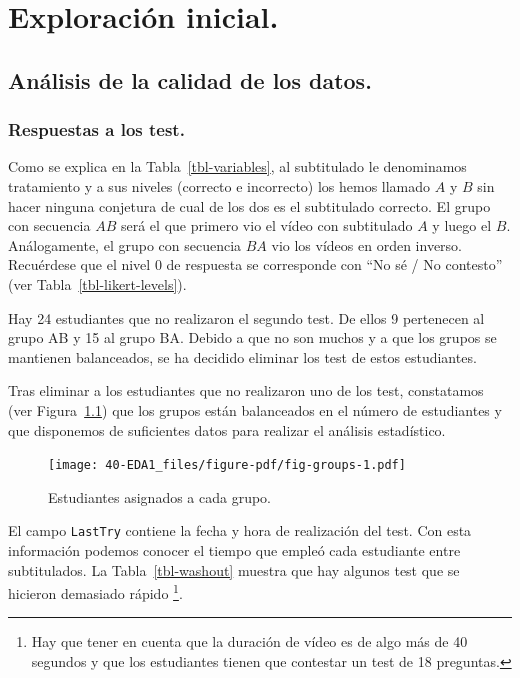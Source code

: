 \documentclass[
  12pt,
  a4paper,
  extrafontsizes,
  onecolumn,
  openright]{memoir}
\begin{document}

\hypertarget{sec-eda}{%
\chapter{Exploración inicial.}\label{sec-eda}}

\hypertarget{anuxe1lisis-de-la-calidad-de-los-datos.}{%
\section{Análisis de la calidad de los
datos.}\label{anuxe1lisis-de-la-calidad-de-los-datos.}}

\hypertarget{sec-eda-2}{%
\subsection{Respuestas a los test.}\label{sec-eda-2}}

Como se explica en la Tabla~\ref{tbl-variables}, al subtitulado le
denominamos tratamiento y a sus niveles (correcto e incorrecto) los
hemos llamado \(A\) y \(B\) sin hacer ninguna conjetura de cual de los
dos es el subtitulado correcto. El grupo con secuencia \(AB\) será el
que primero vio el vídeo con subtitulado \(A\) y luego el \(B\).
Análogamente, el grupo con secuencia \(BA\) vio los vídeos en orden
inverso. Recuérdese que el nivel 0 de respuesta se corresponde con
\enquote{No sé / No contesto} (ver Tabla~\ref{tbl-likert-levels}).

Hay 24 estudiantes que no realizaron el segundo test. De ellos 9
pertenecen al grupo AB y 15 al grupo BA. Debido a que no son muchos y a
que los grupos se mantienen balanceados, se ha decidido eliminar los
test de estos estudiantes.

Tras eliminar a los estudiantes que no realizaron uno de los test,
constatamos (ver Figura~\ref{fig-groups}) que los grupos están
balanceados en el número de estudiantes y que disponemos de suficientes
datos para realizar el análisis estadístico.

\begin{figure}[h]

{\centering \texttt{[image: 40-EDA1\_files/figure-pdf/fig-groups-1.pdf]}

}

\caption{\label{fig-groups}Estudiantes asignados a cada grupo.}

\end{figure}

El campo \texttt{LastTry} contiene la fecha y hora de realización del
test. Con esta información podemos conocer el tiempo que empleó cada
estudiante entre subtitulados. La Tabla~\ref{tbl-washout} muestra que
hay algunos test que se hicieron demasiado rápido \footnote{Hay que
  tener en cuenta que la duración de vídeo es de algo más de 40 segundos
  y que los estudiantes tienen que contestar un test de 18 preguntas.}.
\end{document}
